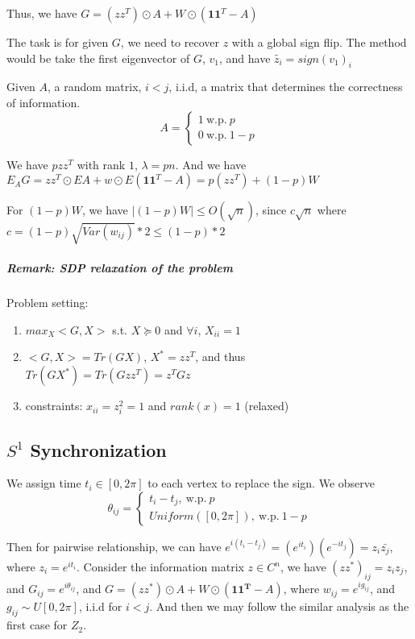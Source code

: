 \documentclass[11pt,letter]{article}
\begin{document}
Thus, we have $G=(zz^T)\odot A+W\odot (\mathbf{1}\mathbf{1}^T-A)$

The task is for given $G$, we need to recover $z$ with a global sign flip. The method would be take the first eigenvector of $G$, $v_1$, and have $\tilde{z_i}=sign(v_1)_i$

Given $A$, a random matrix, $i<j$, i.i.d, a matrix that determines the correctness of information. 
\begin{equation}
A = \begin{cases}
	1\ \text{w.p.}\ p \\
	0\ \text{w.p.}\ 1-p
	\end{cases}
\end{equation}

We have $pzz^T$ with rank $1$, $\lambda = pn$. And we have $E_AG=zz^T\odot EA+w\odot E(\mathbf{1}\mathbf{1}^T-A) = p(zz^T)+(1-p)W$

For $(1-p)W$, we have $|(1-p)W|\leq O(\sqrt{n})$, since $c\sqrt{n}$ where $c=(1-p)\sqrt{Var(w_{ij})}*2\leq (1-p)*2$

\subparagraph{Remark: SDP relaxation of the problem}

Problem setting:
\begin{enumerate}
\item $max_X<G,X>$ s.t. $X\succeq 0$ and $\forall i$, $X_{ii}=1$ 
\item $<G,X>=Tr(GX)$, $X^*=zz^T$, and thus $Tr(GX^*)=Tr(Gzz^T)=z^TGz$
\item constraints: $x_{ii}=z_i^2=1$ and $rank(x)=1$ (relaxed)
\end{enumerate}

\subsection{$S^1$ Synchronization}

We assign time $t_i \in [0,2\pi]$ to each vertex to replace the sign. We observe 
\begin{equation}
\theta_{ij} = \begin{cases}
	t_i-t_j,\ \text{w.p.}\ p\\
	Uniform([0,2\pi]),\ \text{w.p.}\ 1-p
\end{cases}
\end{equation}

Then for pairwise relationship, we can have $e^{i(t_i-t_j)} = (e^{it_i})(e^{-it_j})=z_i\bar{z_j}$, where $z_i=e^{it_i}$. Consider the information matrix $z\in C^{n}$, we have $(zz^*)_{ij}=z_iz_j$, and $G_{ij}=e^{i\theta_{ij}}$, and $G=(zz^*)\odot A+W\odot (\mathbf{1}\mathbf{1^T}-A)$, where $w_{ij}=e^{ig_{ij}}$, and $g_{ij}\sim U[0,2\pi]$, i.i.d for $i<j$. And then we may follow the similar analysis as the first case for $Z_2$.
\end{document}
